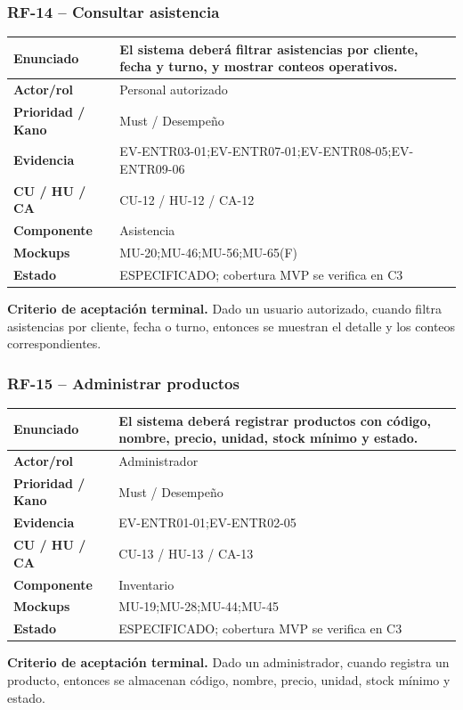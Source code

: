 \documentclass[11pt,a4paper,twoside]{article}
\begin{document}
\subsubsection{RF-14 -- Consultar asistencia}
\begin{tabularx}{\textwidth}{|>{\bfseries}p{3.2cm}|X|}\hline
Enunciado & El sistema deberá filtrar asistencias por cliente, fecha y turno, y mostrar conteos operativos. \\ \hline
Actor/rol & Personal autorizado \\ \hline
Prioridad / Kano & Must / Desempeño \\ \hline
Evidencia & EV-ENTR03-01;EV-ENTR07-01;EV-ENTR08-05;EV-ENTR09-06 \\ \hline
CU / HU / CA & CU-12 / HU-12 / CA-12 \\ \hline
Componente & Asistencia \\ \hline
Mockups & MU-20;MU-46;MU-56;MU-65(F) \\ \hline
Estado & ESPECIFICADO; cobertura MVP se verifica en C3 \\ \hline
\end{tabularx}
\textbf{Criterio de aceptación terminal.} Dado un usuario autorizado, cuando filtra asistencias por cliente, fecha o turno, entonces se muestran el detalle y los conteos correspondientes.
\subsubsection{RF-15 -- Administrar productos}
\begin{tabularx}{\textwidth}{|>{\bfseries}p{3.2cm}|X|}\hline
Enunciado & El sistema deberá registrar productos con código, nombre, precio, unidad, stock mínimo y estado. \\ \hline
Actor/rol & Administrador \\ \hline
Prioridad / Kano & Must / Desempeño \\ \hline
Evidencia & EV-ENTR01-01;EV-ENTR02-05 \\ \hline
CU / HU / CA & CU-13 / HU-13 / CA-13 \\ \hline
Componente & Inventario \\ \hline
Mockups & MU-19;MU-28;MU-44;MU-45 \\ \hline
Estado & ESPECIFICADO; cobertura MVP se verifica en C3 \\ \hline
\end{tabularx}
\textbf{Criterio de aceptación terminal.} Dado un administrador, cuando registra un producto, entonces se almacenan código, nombre, precio, unidad, stock mínimo y estado.
\end{document}
